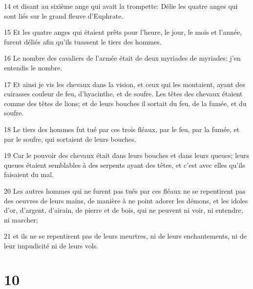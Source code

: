 \par 14 et disant au sixième ange qui avait la trompette: Délie les quatre anges qui sont liés sur le grand fleuve d'Euphrate.
\par 15 Et les quatre anges qui étaient prêts pour l'heure, le jour, le mois et l'année, furent déliés afin qu'ils tuassent le tiers des hommes.
\par 16 Le nombre des cavaliers de l'armée était de deux myriades de myriades: j'en entendis le nombre.
\par 17 Et ainsi je vis les chevaux dans la vision, et ceux qui les montaient, ayant des cuirasses couleur de feu, d'hyacinthe, et de soufre. Les têtes des chevaux étaient comme des têtes de lions; et de leurs bouches il sortait du feu, de la fumée, et du soufre.
\par 18 Le tiers des hommes fut tué par ces trois fléaux, par le feu, par la fumée, et par le soufre, qui sortaient de leurs bouches.
\par 19 Car le pouvoir des chevaux était dans leurs bouches et dans leurs queues; leurs queues étaient semblables à des serpents ayant des têtes, et c'est avec elles qu'ils faisaient du mal.
\par 20 Les autres hommes qui ne furent pas tués par ces fléaux ne se repentirent pas des oeuvres de leurs mains, de manière à ne point adorer les démons, et les idoles d'or, d'argent, d'airain, de pierre et de bois, qui ne peuvent ni voir, ni entendre, ni marcher;
\par 21 et ils ne se repentirent pas de leurs meurtres, ni de leurs enchantements, ni de leur impudicité ni de leurs vols.

\chapter{10}

